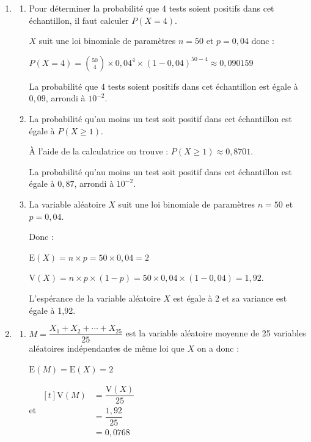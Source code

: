 \documentclass[10pt]{article}
\providecommand{\np}[2][]{{#2~#1}}
\providecommand{\ds}{\displaystyle}
\begin{document}
\begin{enumerate}
	\item 
	\begin{enumerate}
		\item Pour déterminer la probabilité que 4 tests soient positifs dans cet échantillon, il faut calculer $P(X=4)$. 
		
		$X$ suit une loi binomiale de paramètres $n=50$ et $p=0,04$ donc : 
		
		$P(X=4) = \ds \binom{50}{4}  \times 0,04 ^{4} \times (1-0,04)^{50-4}\approx 0,090159 $
		
		La probabilité que 4 tests soient positifs dans cet échantillon est égale à $0,09$, arrondi  à $10^{-2}$.
		
		\item La probabilité qu'au moins un test soit positif dans cet échantillon est égale à $P(X\geqslant 1)$. 
		
		À l'aide de la calculatrice on trouve : $P(X\geqslant 1) \approx 0,8701$. 
		
		
		La probabilité qu'au moins un test soit positif dans cet échantillon est égale à $0,87$, arrondi à $10^{-2}$.
		\item  La variable aléatoire $X$ suit une loi binomiale de paramètres $n=50$ et $p=0,04$.
		
		Donc : 
		
		$\mathrm{E}(X)=n \times p = 50 \times 0,04 = 2$ 
		
		$\mathrm{V}(X) = n \times p \times (1-p)= 50 \times 0,04 \times (1-0,04) = 1,92$.
		
		L'espérance  de la variable aléatoire $X$ est égale à 2 et sa variance  est égale à 1,92. 
	\end{enumerate}
	
\item 

	\begin{enumerate}
		\item $M=\dfrac{X_{1}+X_{2}+\cdots+X_{25}}{25}$ est la variable aléatoire  moyenne de 25 variables aléatoires indépendantes de même loi que $X$ on a donc :
		
		
		
		$\mathrm{E}\left(M\right) = \mathrm{E}\left(X\right) = 2$
		
		et   $\begin{aligned}[t] \mathrm{V} \left(M\right) &= \dfrac {\mathrm{V}(X)}{25}\\
			&= \dfrac{1,92}{25}\\
			&=\np{0,0768}
		\end{aligned} $
		

\end{enumerate}
\end{enumerate}
\end{document}
